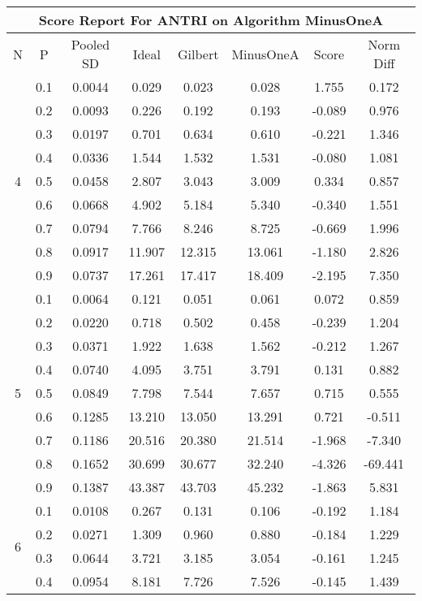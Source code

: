\documentclass[11pt,a4paper]{report}
\begin{document}
\begin{longtable}{ | c | c || c | c | c | c | c | c | }
\hline
\multicolumn{8}{|c|}{ Score Report For ANTRI on Algorithm MinusOneA} \\
\hline
N & P & Pooled SD &  Ideal &  Gilbert & MinusOneA  & Score & Norm Diff \\
 \hline
 \hline
 \endhead
\multirow{9}{*}{4} & 0.1 & 0.0044 & 0.029 & 0.023 & 0.028 & 1.755 & 0.172 \\
 & 0.2 & 0.0093 & 0.226 & 0.192 & 0.193 & -0.089 & 0.976 \\
 & 0.3 & 0.0197 & 0.701 & 0.634 & 0.610 & -0.221 & 1.346 \\
 & 0.4 & 0.0336 & 1.544 & 1.532 & 1.531 & -0.080 & 1.081 \\
 & 0.5 & 0.0458 & 2.807 & 3.043 & 3.009 & 0.334 & 0.857 \\
 & 0.6 & 0.0668 & 4.902 & 5.184 & 5.340 & -0.340 & 1.551 \\
 & 0.7 & 0.0794 & 7.766 & 8.246 & 8.725 & -0.669 & 1.996 \\
 & 0.8 & 0.0917 & 11.907 & 12.315 & 13.061 & -1.180 & 2.826 \\
 & 0.9 & 0.0737 & 17.261 & 17.417 & 18.409 & -2.195 & 7.350 \\
 \hline
\multirow{9}{*}{5} & 0.1 & 0.0064 & 0.121 & 0.051 & 0.061 & 0.072 & 0.859 \\
 & 0.2 & 0.0220 & 0.718 & 0.502 & 0.458 & -0.239 & 1.204 \\
 & 0.3 & 0.0371 & 1.922 & 1.638 & 1.562 & -0.212 & 1.267 \\
 & 0.4 & 0.0740 & 4.095 & 3.751 & 3.791 & 0.131 & 0.882 \\
 & 0.5 & 0.0849 & 7.798 & 7.544 & 7.657 & 0.715 & 0.555 \\
 & 0.6 & 0.1285 & 13.210 & 13.050 & 13.291 & 0.721 & -0.511 \\
 & 0.7 & 0.1186 & 20.516 & 20.380 & 21.514 & -1.968 & -7.340 \\
 & 0.8 & 0.1652 & 30.699 & 30.677 & 32.240 & -4.326 & -69.441 \\
 & 0.9 & 0.1387 & 43.387 & 43.703 & 45.232 & -1.863 & 5.831 \\
 \hline
\multirow{9}{*}{6} & 0.1 & 0.0108 & 0.267 & 0.131 & 0.106 & -0.192 & 1.184 \\
 & 0.2 & 0.0271 & 1.309 & 0.960 & 0.880 & -0.184 & 1.229 \\
 & 0.3 & 0.0644 & 3.721 & 3.185 & 3.054 & -0.161 & 1.245 \\
 & 0.4 & 0.0954 & 8.181 & 7.726 & 7.526 & -0.145 & 1.439 \\

\end{longtable}
\end{document}
